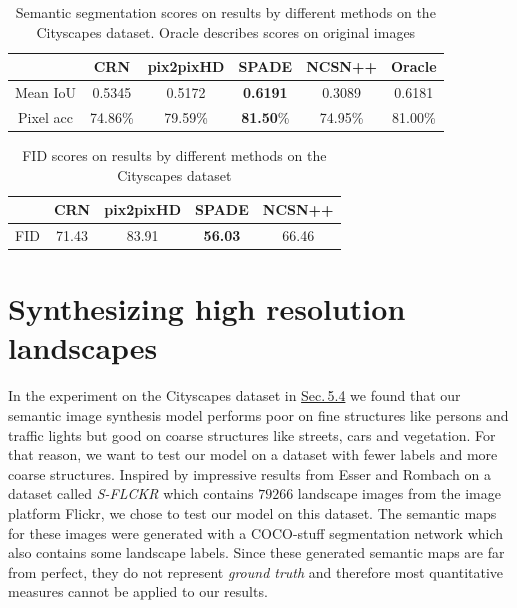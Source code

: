 \begin{table}[] \label{tab:5.4}
    \centering
    \begin{tabular}{ccccc|c}
         \toprule
         &  CRN \cite{crn} & pix2pixHD \cite{pix2pixHD} & SPADE \cite{spade} & NCSN++ \cite{score_3} & Oracle\\
         \midrule
        Mean IoU & 0.5345 & 0.5172 & \textbf{0.6191} & 0.3089 & 0.6181\\
        Pixel acc & 74.86\% & 79.59\% & \textbf{81.50}\% & 74.95\% & 81.00\%\\
        \bottomrule
    \end{tabular}
    \caption[Semantic segmentation scores on Cityscapes dataset]{Semantic segmentation scores on results by different
methods on the Cityscapes dataset. Oracle describes scores on original images}
    \label{tab:my_label}
\end{table}

\begin{table}[] \label{tab:5.5}
    \centering
    \begin{tabular}{ccccc}
        \toprule
         &  CRN \cite{crn} & pix2pixHD \cite{pix2pixHD} & SPADE \cite{spade} & NCSN++ \cite{score_3}\\
         \midrule
         FID & 71.43 & 83.91 & \textbf{56.03} & 66.46\\
         \bottomrule
    \end{tabular}
    \caption[FID scores on results by different methods on the Cityscapes dataset]{FID scores on results by different methods on the Cityscapes dataset}
    \label{tab:my_label}
\end{table}



\section[Synthesizing high resolution landscapes]{Synthesizing high resolution landscapes%
    } \label{sec:5.5}
In the experiment on the Cityscapes dataset in \hyperref[sec:5.4]{Sec.\,5.4} we found that our semantic image synthesis model performs poor on fine structures like persons and traffic lights but good on coarse structures like streets, cars and vegetation. For that reason, we want to test our model on a dataset with fewer labels and more coarse structures. Inspired by impressive results from Esser and Rombach \cite{taming} on a dataset called \textit{S-FLCKR} which contains $79266$ landscape images from the image platform Flickr, we chose to test our model on this dataset. The semantic maps for these images were generated with a COCO-stuff \cite{coco_stuff} segmentation network which also contains some landscape labels. Since these generated semantic maps are far from perfect, they do not represent \textit{ground truth} and therefore most quantitative measures cannot be applied to our results.

